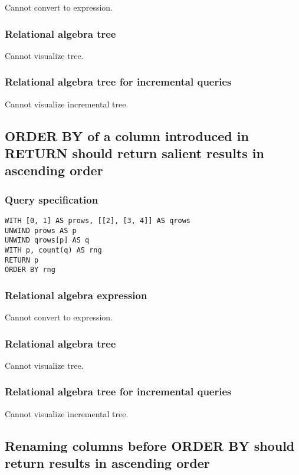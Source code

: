 Cannot convert to expression.

\subsubsection*{Relational algebra tree}

Cannot visualize tree.

\subsubsection*{Relational algebra tree for incremental queries}

Cannot visualize incremental tree.

\subsection{ORDER BY of a column introduced in RETURN should return salient results in ascending order}

\subsubsection*{Query specification}

\begin{lstlisting}
WITH [0, 1] AS prows, [[2], [3, 4]] AS qrows
UNWIND prows AS p
UNWIND qrows[p] AS q
WITH p, count(q) AS rng
RETURN p
ORDER BY rng
\end{lstlisting}

\subsubsection*{Relational algebra expression}

Cannot convert to expression.

\subsubsection*{Relational algebra tree}

Cannot visualize tree.

\subsubsection*{Relational algebra tree for incremental queries}

Cannot visualize incremental tree.

\subsection{Renaming columns before ORDER BY should return results in ascending order}

